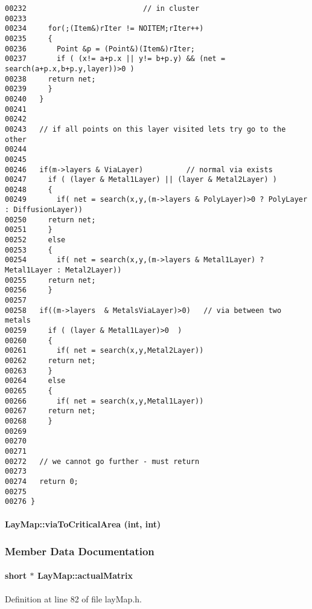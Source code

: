 \begin{verbatim}
00232                           // in cluster
00233 
00234     for(;(Item&)rIter != NOITEM;rIter++)
00235     {
00236       Point &p = (Point&)(Item&)rIter;
00237       if ( (x!= a+p.x || y!= b+p.y) && (net = search(a+p.x,b+p.y,layer))>0 )
00238     return net;
00239     }
00240   }
00241 
00242 
00243   // if all points on this layer visited lets try go to the other
00244 
00245 
00246   if(m->layers & ViaLayer)          // normal via exists 
00247     if ( (layer & Metal1Layer) || (layer & Metal2Layer) )
00248     {
00249       if( net = search(x,y,(m->layers & PolyLayer)>0 ? PolyLayer : DiffusionLayer))
00250     return net;
00251     }
00252     else
00253     {
00254       if( net = search(x,y,(m->layers & Metal1Layer) ? Metal1Layer : Metal2Layer))
00255     return net;
00256     }
00257 
00258   if((m->layers  & MetalsViaLayer)>0)   // via between two metals
00259     if ( (layer & Metal1Layer)>0  )
00260     {  
00261       if( net = search(x,y,Metal2Layer))
00262     return net;
00263     }
00264     else
00265     {
00266       if( net = search(x,y,Metal1Layer))
00267     return net;
00268     }  
00269 
00270   
00271 
00272   // we cannot go further - must return
00273 
00274   return 0;
00275 
00276 }
\end{verbatim}\normalsize 
\label{LayMap_a2}
\paragraph{ Lay\-Map::via\-To\-Critical\-Area (int, int)}\hfill



\subsubsection{Member Data Documentation}
\label{LayMap_o7}
\paragraph{\setlength{\rightskip}{0pt plus 5cm}short $\ast$ Lay\-Map::actual\-Matrix\hspace{0.3cm}{\tt  [private]}}\hfill



Definition at line 82 of file lay\-Map.h.\label{LayMap_o9}
